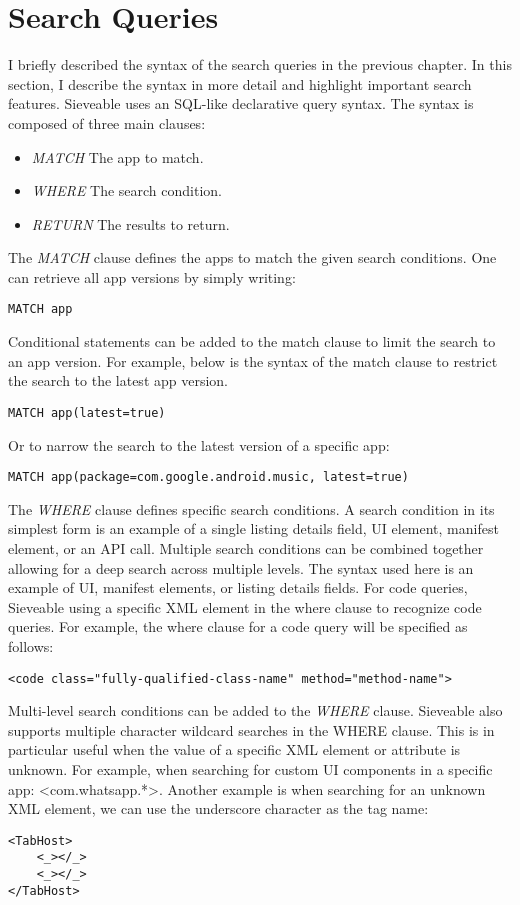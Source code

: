 \section{Search Queries}
I briefly described the syntax of the search queries in the previous chapter.
In this section, I describe the syntax in more detail and highlight important search features.
Sieveable uses an SQL-like declarative query syntax.
The syntax is composed of three main clauses:
\begin{itemize}
	\item \textit{MATCH} The app to match.
	\item \textit{WHERE} The search condition.
	\item \textit{RETURN} The results to return.
\end{itemize}
The \textit{MATCH} clause defines the apps to match the given search conditions.
One can retrieve all app versions by simply writing:
\begin{verbatim}
MATCH app
\end{verbatim}
Conditional statements can be added to the match clause to limit the search to an app version.
For example, below is the syntax of the match clause to restrict the search to the latest app version.
\begin{verbatim}
MATCH app(latest=true)
\end{verbatim}
Or to narrow the search to the latest version of a specific app:
\begin{verbatim}
MATCH app(package=com.google.android.music, latest=true)
\end{verbatim}

The \textit{WHERE} clause defines specific search conditions. 
A search condition in its simplest form is an example of a single listing details field, UI element, manifest element, or an API call.
Multiple search conditions can be combined together allowing for a deep search across multiple levels.
The syntax used here is an example of UI, manifest elements, or listing details fields.
For code queries, Sieveable using a specific XML element in the where clause to recognize code queries.
For example, the where clause for a code query will be specified as follows:
\begin{verbatim}
<code class="fully-qualified-class-name" method="method-name">
\end{verbatim}
Multi-level search conditions can be added to the \textit{WHERE} clause.
Sieveable also supports multiple character wildcard searches in the WHERE clause.
This is in particular useful when the value of a specific XML element or attribute is unknown.
For example, when searching for custom UI components in a specific app: \textless com.whatsapp.*\textgreater.
Another example is when searching for an unknown XML element, we can use the underscore character as the tag name:
\begin{verbatim}
<TabHost>
    <_></_>
    <_></_>
</TabHost>
\end{verbatim}

